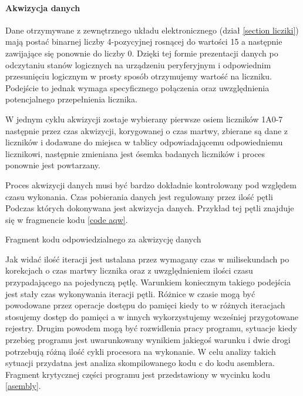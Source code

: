 \documentclass[a4paper,12pt]{article}
\begin{document}
\paragraph{Akwizycja danych}
Dane otrzymywane z zewnętrznego układu elektronicznego (dział \ref{section licziki}) mają postać binarnej liczby 4-pozycyjnej rosnącej do wartości 15 a następnie zawijające się ponownie do liczby 0. 
Dzięki tej formie prezentacji danych po odczytaniu stanów logicznych na urządzeniu peryferyjnym i odpowiednim przesunięciu logicznym w prosty sposób otrzymujemy wartość na liczniku. 
Podejście to jednak wymaga specyficznego połączenia oraz uwzględnienia potencjalnego przepełnienia licznika. 

W jednym cyklu akwizycji zostaje wybierany pierwsze osiem liczników 1A0-7 następnie przez czas akwizycji, korygowanej o czas martwy, zbierane są dane z liczników i dodawane do miejsca w tablicy odpowiadającemu odpowiedniemu licznikowi, następnie zmieniana jest ósemka badanych liczników i proces ponownie jest powtarzany. 

Proces akwizycji danych musi być bardzo dokładnie kontrolowany pod względem czasu wykonania.
Czas pobierania danych jest regulowany przez ilość pętli Podczas których dokonywana jest akwizycja danych. 
Przykład tej pętli znajduje się w fragmencie kodu \ref{code aqw}.

\begin{kod}
        
        \caption{Fragment kodu odpowiedzialnego za akwizycję danych}
        \label{code aqw}
\end{kod}

Jak widać ilość iteracji jest ustalana przez wymagany czas w milisekundach po korekcjach o czas martwy licznika oraz z uwzględnieniem ilości czasu przypadającego na pojedynczą pętlę. 
Warunkiem koniecznym takiego podejścia jest stały czas wykonywania iteracji pętli. 
Różnice w czasie mogą być powodowane przez operacje dostępu do pamięci kiedy to w różnych iteracjach stosujemy dostęp do pamięci a w innych wykorzystujemy wcześniej przygotowane rejestry.
Drugim powodem mogą być rozwidlenia pracy programu, sytuacje kiedy przebieg programu jest uwarunkowany wynikiem jakiegoś warunku i dwie drogi potrzebują różną ilość cykli procesora na wykonanie. 
W celu analizy takich sytuacji przydatna jest analiza skompilowanego kodu c do kodu asemblera.
Fragment krytycznej części programu jest przedstawiony w wycinku kodu \ref{asembly}.
\end{document}
